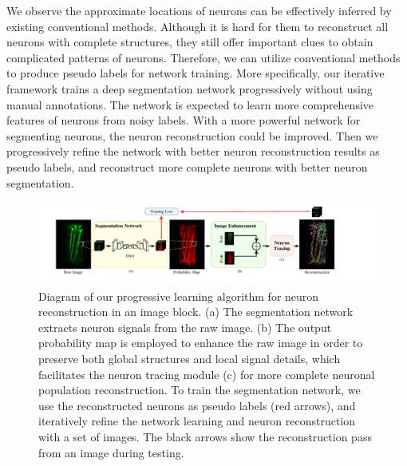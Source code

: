 We observe the approximate locations of neurons can be effectively inferred by existing conventional methods.
Although it is hard for them to reconstruct all neurons with complete structures, they still offer important clues to obtain complicated patterns of neurons.
Therefore, we can utilize conventional methods to produce pseudo labels for network training.
More specifically, our iterative framework trains a deep segmentation network progressively without using manual annotations.
The network is expected to learn more comprehensive features of neurons from noisy labels.
With a more powerful network for segmenting neurons, the neuron reconstruction could be improved.
Then we progressively refine the network with better neuron reconstruction results as pseudo labels, and reconstruct more complete neurons with better neuron segmentation.

\begin{figure}[th]
	\centering
	\includegraphics[width=1\textwidth]{./Illustrations/framework2.pdf}
	\caption{Diagram of our progressive learning algorithm for neuron reconstruction in an image block. (a) The segmentation network extracts neuron signals from the raw image. (b) The output probability map is employed to enhance the raw image in order to preserve both global structures and local signal details, which facilitates the neuron tracing module (c) for more complete neuronal population reconstruction. To train the segmentation network, we use the reconstructed neurons as pseudo labels (red arrows), and iteratively refine the network learning and neuron reconstruction with a set of images. The black arrows show the reconstruction pass from an image during testing.}
	\label{fig:framework}
\end{figure}

